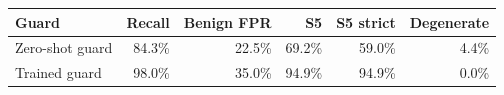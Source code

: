 \begin{tabular}{lrrrrr}
\toprule
Guard & Recall & Benign FPR & S5 & S5 strict & Degenerate \\
\midrule
Zero-shot guard & 84.3\% & 22.5\% & 69.2\% & 59.0\% & 4.4\% \\
Trained guard & 98.0\% & 35.0\% & 94.9\% & 94.9\% & 0.0\% \\
\bottomrule
\end{tabular}
